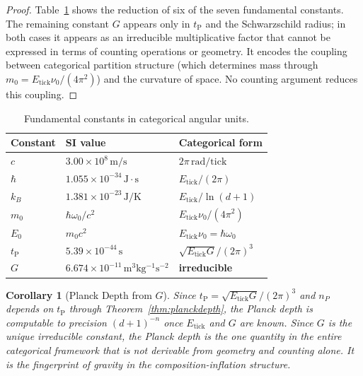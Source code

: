 \documentclass[twocolumn,10pt,a4paper]{article}
\theoremstyle{thmstyle}
\newtheorem{corollary}[theorem]{Corollary}
\theoremstyle{definition}
\theoremstyle{remark}
\newcommand{\tP}{t_{\mathrm{P}}}
\begin{document}
\begin{proof}
Table~\ref{tab:constants} shows the reduction of six of the seven
fundamental constants. The remaining constant $G$ appears only in
$\tP$ and the Schwarzschild radius; in both cases it appears as an
irreducible multiplicative factor that cannot be expressed in terms of
counting operations or geometry. It encodes the coupling between
categorical partition structure (which determines mass through
$m_0 = E_{\mathrm{tick}}\nu_0/(4\pi^2)$) and the curvature of space.
No counting argument reduces this coupling.
\end{proof}

\begin{table}[h]
\centering
\caption{Fundamental constants in categorical angular units.}
\label{tab:constants}
\begin{tabular}{lll}
\toprule
Constant & SI value & Categorical form \\
\midrule
$c$ & $3.00 \times 10^8\,\mathrm{m/s}$ & $2\pi\,\mathrm{rad/tick}$ \\
$\hbar$ & $1.055 \times 10^{-34}\,\mathrm{J\cdot s}$ & $E_{\mathrm{tick}}/(2\pi)$ \\
$k_B$ & $1.381 \times 10^{-23}\,\mathrm{J/K}$ & $E_{\mathrm{tick}}/\ln(d+1)$ \\
$m_0$ & $\hbar\omega_0/c^2$ & $E_{\mathrm{tick}}\nu_0/(4\pi^2)$ \\
$E_0$ & $m_0 c^2$ & $E_{\mathrm{tick}}\nu_0 = \hbar\omega_0$ \\
$\tP$ & $5.39 \times 10^{-44}\,\mathrm{s}$ & $\sqrt{E_{\mathrm{tick}}G}/(2\pi)^3$ \\
$G$ & $6.674 \times 10^{-11}\,\mathrm{m^3 kg^{-1} s^{-2}}$ & \textbf{irreducible} \\
\bottomrule
\end{tabular}
\end{table}

\begin{corollary}[Planck Depth from $G$]
\label{cor:planckdepthG}
Since $\tP = \sqrt{E_{\mathrm{tick}} G}/(2\pi)^3$ and $n_P$ depends on $\tP$
through Theorem~\ref{thm:planckdepth}, the Planck depth is computable to
precision $(d+1)^{-n}$ once $E_{\mathrm{tick}}$ and $G$ are known. Since $G$
is the unique irreducible constant, the Planck depth is the one quantity in
the entire categorical framework that is not derivable from geometry and
counting alone. It is the fingerprint of gravity in the composition-inflation
structure.
\end{corollary}
\end{document}
